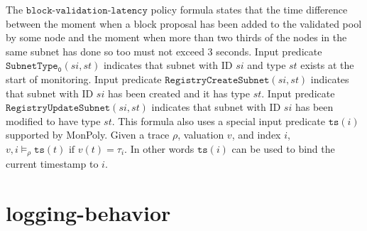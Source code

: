\documentclass[a4paper,headings=normal]{scrartcl}
\newcommand*{\Pred}[1]{\mathtt{#1}}
\newcommand*{\tspred}{\Pred{ts}}
\newcommand*{\OrigSubnetType}{\Pred{SubnetType_{0}}}
\newcommand*{\SubnetCreated}{\Pred{RegistryCreateSubnet}}
\newcommand*{\SubnetUpdated}{\Pred{RegistryUpdateSubnet}}
\newcommand*{\APL}{\texttt{block-validation-latency}}
\begin{document}
The $\APL$ policy formula states that the time difference between
the moment when a block proposal has been added to the validated pool by some node
and
the moment when more than two thirds of the nodes in the same subnet has done so too
must not exceed 3 seconds.
Input predicate $\OrigSubnetType(si,st)$ indicates that subnet with ID $si$ and type $st$
exists at the start of monitoring. Input predicate $\SubnetCreated(si,st)$ indicates that
subnet with ID $si$ has been created and it has type $st$.
Input predicate $\SubnetUpdated(si,st)$ indicates that
subnet with ID $si$ has been modified to have type $st$.
This formula also uses a special input predicate $\tspred(i)$ supported by MonPoly.
Given a trace $\rho$, valuation $v$, and index $i$, $v, i \models_\rho \tspred(t) \text{ if } v(t) = \tau_i$.
In other words $\tspred(i)$ can be used to bind the current timestamp to $i$.


\section{logging-behavior}
\end{document}
